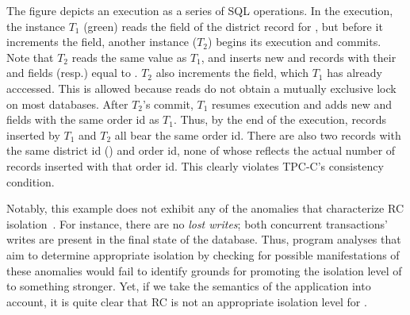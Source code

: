 
The figure depicts an execution as a series of SQL 
operations. In the execution, the  instance
$T_1$ (green) reads the  field of the district
record for , but before it increments the field, another
 instance ($T_2$) begins its execution and commits. Note
that $T_2$ reads the same  value as $T_1$, and
inserts new  and  records with their 
and  fields (resp.) equal to . $T_2$
also increments the  field, which $T_1$ has already
acccessed. This is allowed because reads do not obtain a mutually
exclusive lock on most databases. After $T_2$'s commit, $T_1$ resumes
execution and adds new  and  fields with the
same order id as $T_1$. Thus, by the end of the execution,
 records inserted by $T_1$ and $T_2$ all bear the same
order id. There are also two  records with the same district
id () and order id, none of whose  reflects the
actual number of  records inserted with that order id.
This clearly violates TPC-C's consistency condition. 

Notably, this example does not exhibit any of the anomalies that
characterize RC isolation~\cite{berenson}. For instance, there are no
\emph{lost writes}; both concurrent transactions' writes are present
in the final state of the database. Thus, program analyses that aim to
determine appropriate isolation by checking for possible
manifestations of these anomalies would fail to identify grounds for
promoting the isolation level of  to something stronger.
Yet, if we take the semantics of the application into account, it is
quite clear that RC is not an appropriate isolation level for
.

